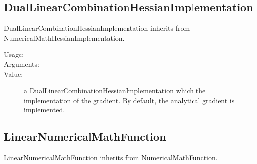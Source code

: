 
\newpage
\subsection{DualLinearCombinationHessianImplementation}


DualLinearCombinationHessianImplementation inherits from NumericalMathHessianImplementation.

\begin{description}

\item[Usage:]   \rule{0pt}{1em}

\item[Arguments:]  \rule{0pt}{1em}


\item[Value:] a  DualLinearCombinationHessianImplementation which the implementation of the gradient. By default, the analytical gradient is implemented.

\end{description}

\newpage
{}
\subsection{LinearNumericalMathFunction}

LinearNumericalMathFunction inherits from NumericalMathFunction.

